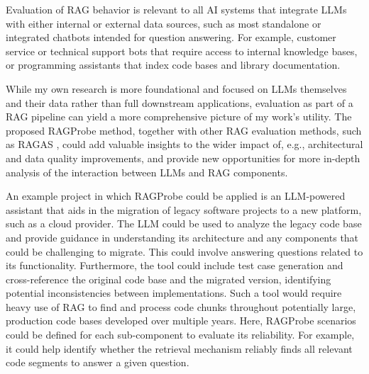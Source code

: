 \documentclass[11pt]{article}
\begin{document}
Evaluation of RAG behavior is relevant to all AI systems that integrate LLMs with either internal or external data sources, such as most standalone or integrated chatbots intended for question answering. For example, customer service or technical support bots that require access to internal knowledge bases, or programming assistants that index code bases and library documentation.

While my own research is more foundational and focused on LLMs themselves and their data rather than full downstream applications, evaluation as part of a RAG pipeline can yield a more comprehensive picture of my work's utility. The proposed RAGProbe method, together with other RAG evaluation methods, such as RAGAS \parencite{Shahul2023RAGAsAE}, could add valuable insights to the wider impact of, e.g., architectural and data quality improvements, and provide new opportunities for more in-depth analysis of the interaction between LLMs and RAG components.

An example project in which RAGProbe could be applied is an LLM-powered assistant that aids in the migration of legacy software projects to a new platform, such as a cloud provider. The LLM could be used to analyze the legacy code base and provide guidance in understanding its architecture and any components that could be challenging to migrate. This could involve answering questions related to its functionality. Furthermore, the tool could include test case generation and cross-reference the original code base and the migrated version, identifying potential inconsistencies between implementations. Such a tool would require heavy use of RAG to find and process code chunks throughout potentially large, production code bases developed over multiple years. Here, RAGProbe scenarios could be defined for each sub-component to evaluate its reliability. For example, it could help identify whether the retrieval mechanism reliably finds all relevant code segments to answer a given question.
\end{document}
